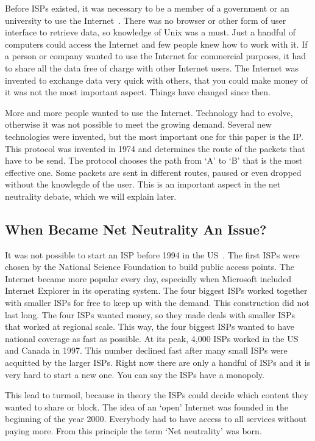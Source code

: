 Before \acp{ISP} existed, it was necessary to be a member of a government or an university to use the Internet~\cite{historyisp}. There was no browser or other form of user interface to retrieve data, so knowledge of Unix was a must. Just a handful of computers could access the Internet and few people knew how to work with it. If a person or company wanted to use the Internet for commercial purposes, it had to share all the data free of charge with other Internet users. The Internet was invented to exchange data very quick with others, that you could make money of it was not the most important aspect. Things have changed since then.

More and more people wanted to use the Internet. Technology had to evolve, otherwise it was not possible to meet the growing demand. Several new technologies were invented, but the most important one for this paper is the \acf{IP}. This protocol was invented in 1974 and determines the route of the packets that have to be send. The protocol chooses the path from `A' to `B' that is the most effective one. Some packets are sent in different routes, paused or even dropped without the knowlegde of the user. This is an important aspect in the net neutrality debate, which we will explain later.

\subsection{When Became Net Neutrality An Issue?}
It was not possible to start an \ac{ISP} before 1994 in the US~\cite{historyisp}. The first \acp{ISP} were chosen by the National Science Foundation to build public access points. The Internet became more popular every day, especially when Microsoft included Internet Explorer in its operating system. The four biggest \acp{ISP} worked together with smaller \acp{ISP} for free to keep up with the demand. This construction did not last long. The four \acp{ISP} wanted money, so they made deals with smaller \acp{ISP} that worked at regional scale. This way, the four biggest \acp{ISP} wanted to have national coverage as fast as possible. At its peak, 4,000 \acp{ISP} worked in the US and Canada in 1997. This number declined fast after many small \acp{ISP} were acquitted by the larger \acp{ISP}. Right now there are only a handful of \acp{ISP} and it is very hard to start a new one. You can say the \acp{ISP} have a monopoly.

This lead to turmoil, because in theory the \acp{ISP} could decide which content they wanted to share or block. The idea of an `open' Internet was founded in the beginning of the year 2000. Everybody had to have access to all services without paying more. From this principle the term `Net neutrality' was born.